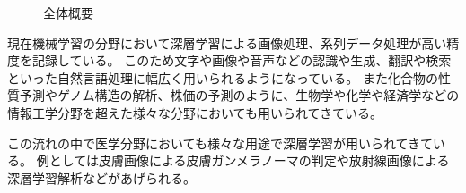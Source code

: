 \begin{figure}[htbp]
    \centering
         \quad
         \quad
    \captionsetup{format=plain,font=normalsize,margin=30pt,name=図}
    \caption[]{全体概要}
    \label{fig:overview}
\end{figure}

現在機械学習の分野において深層学習による画像処理\cite{CNN,AlexNet,VGG,ResNet}、系列データ処理\cite{RNN,GRU,LSTM,Transformer}が高い精度を記録している。
このため文字や画像や音声などの認識\cite{DL_LVCSR,ImageNet}や生成\cite{GAN,VAE}、翻訳\cite{Transformer,Seq2Seq,effective_attention}や検索\cite{anxious_learning}といった自然言語処理に幅広く用いられるようになっている。
また化合物の性質予測\cite{Chemistry1,Chemistry2}やゲノム構造の解析\cite{Genomics}、株価の予測\cite{stock_prediction}のように、生物学や化学や経済学などの情報工学分野を超えた様々な分野においても用いられてきている。

この流れの中で医学分野においても様々な用途で深層学習が用いられてきている。
例としては皮膚画像による皮膚ガンメラノーマの判定\cite{skin_cancer_melanoma}や放射線画像による深層学習解析\cite{radiology}などがあげられる。

